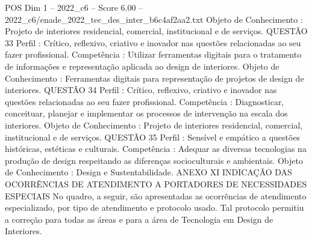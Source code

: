 \begin{textsample}{POS Dim 1 – 2022\_c6 – Score 6.00 – 2022\_c6/enade\_2022\_tec\_des\_inter\_b6c4af2aa2.txt}
Objeto de Conhecimento : Projeto de interiores residencial, comercial, institucional e de serviços.
QUESTÃO 33 Perfil : Crítico, reflexivo, criativo e inovador nas questões relacionadas ao seu fazer profissional.
Competência : Utilizar ferramentas digitais para o tratamento de informações e representação aplicada ao design de interiores.
Objeto de Conhecimento : Ferramentas digitais para representação de projetos de design de interiores.
QUESTÃO 34 Perfil : Crítico, reflexivo, criativo e inovador nas questões relacionadas ao seu fazer profissional.
Competência : Diagnosticar, conceituar, planejar e implementar os processos de intervenção na escala dos interiores.
Objeto de Conhecimento : Projeto de interiores residencial, comercial, institucional e de serviços.
QUESTÃO 35 Perfil : Sensível e empático a questões históricas, estéticas e culturais.
Competência : Adequar as diversas tecnologias na produção de design respeitando as diferenças socioculturais e ambientais.
Objeto de Conhecimento : Design e Sustentabilidade.
ANEXO XI INDICAÇÃO DAS OCORRÊNCIAS DE ATENDIMENTO A PORTADORES DE NECESSIDADES ESPECIAIS No quadro, a seguir, são apresentadas as ocorrências de atendimento especializado, por tipo de atendimento e protocolo usado.
Tal protocolo permitiu a correção para todas as áreas e para a área de Tecnologia em Design de Interiores.

\end{textsample}
